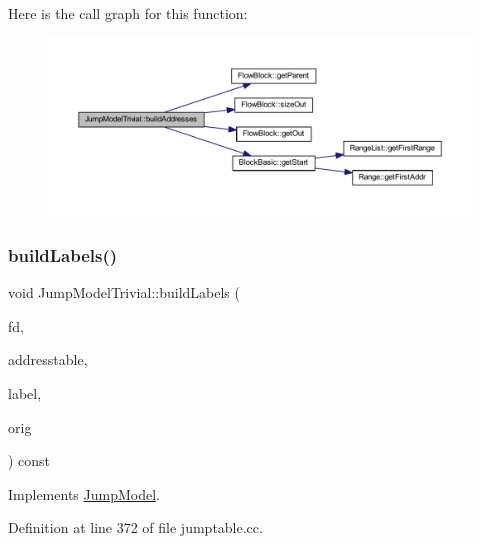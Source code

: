 Here is the call graph for this function\+:
\nopagebreak
\begin{figure}[H]
\begin{center}
\leavevmode
\includegraphics[width=350pt]{class_jump_model_trivial_a598ff420975134b8921c4a5ade192e0f_cgraph}
\end{center}
\end{figure}
\mbox{\label{class_jump_model_trivial_a2f156e909104f7a992e61a288e207c08}} 
\subsubsection{\texorpdfstring{buildLabels()}{buildLabels()}}
{\footnotesize\ttfamily void Jump\+Model\+Trivial\+::build\+Labels (\begin{DoxyParamCaption}\item[{\mbox{\hyperlink{class_funcdata}{Funcdata}} $\ast$}]{fd,  }\item[{vector$<$ \mbox{\hyperlink{class_address}{Address}} $>$ \&}]{addresstable,  }\item[{vector$<$ \mbox{\hyperlink{types_8h_a2db313c5d32a12b01d26ac9b3bca178f}{uintb}} $>$ \&}]{label,  }\item[{const \mbox{\hyperlink{class_jump_model}{Jump\+Model}} $\ast$}]{orig }\end{DoxyParamCaption}) const\hspace{0.3cm}{\ttfamily [virtual]}}



Implements \mbox{\hyperlink{class_jump_model_af8e7b936b4b51d87b7690693f756ffd6}{Jump\+Model}}.



Definition at line 372 of file jumptable.\+cc.

\mbox{\label{class_jump_model_trivial_a2bfb18481b0de41daaa7a47c00c0a8f0}} 
